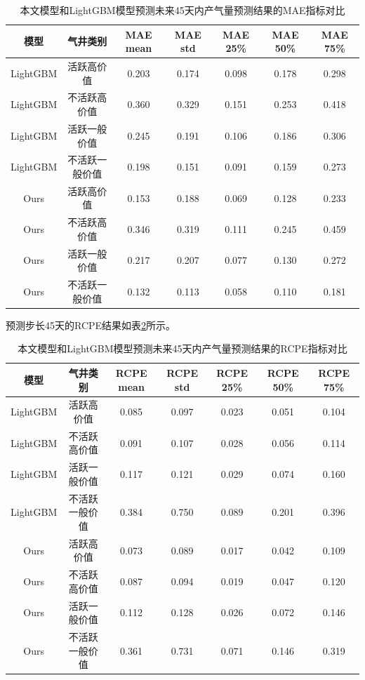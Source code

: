 \begin{table}[H]
    \renewcommand{\arraystretch}{1.5}
    \centering
    \caption{本文模型和LightGBM模型预测未来45天内产气量预测结果的MAE指标对比}
    \label{tab:MAE45}
    \begin{tabular}{|c|c|c|c|c|c|c|}
    \hline
    模型       & 气井类别 & MAE mean & MAE std & MAE 25\% & MAE 50\% & MAE 75\% \\ \hline
    LightGBM  & 活跃高价值        & 0.203   & 0.174    &0.098    & 0.178     & 0.298 \\ \hline
    LightGBM  & 不活跃高价值      & 0.360    & 0.329   & 0.151    & 0.253    & 0.418    \\ \hline
    LightGBM  & 活跃一般价值     & 0.245    & 0.191   & 0.106    & 0.186    & 0.306    \\ \hline
    LightGBM  & 不活跃一般价值      & 0.198    & 0.151   & 0.091    & 0.159    & 0.273    \\ \hline
    Ours       & 活跃高价值        &0.153     & 0.188   & 0.069     & 0.128   & 0.233   \\ \hline
    Ours       & 不活跃高价值      & 0.346    & 0.319   & 0.111    & 0.245    & 0.459    \\ \hline
    Ours       & 活跃一般价值     & 0.217    & 0.207   & 0.077    & 0.130    & 0.272    \\ \hline
    Ours       & 不活跃一般价值      & 0.132    & 0.113   & 0.058    & 0.110    & 0.181    \\ \hline
    \end{tabular}
\end{table}
预测步长45天的RCPE结果如表\ref{tab:RCPE45}所示。 
\begin{table}[H]
    \renewcommand{\arraystretch}{1.5}
    \centering
    \caption{本文模型和LightGBM模型预测未来45天内产气量预测结果的RCPE指标对比}
    \label{tab:RCPE45}
    \begin{tabular}{|c|c|c|c|c|c|c|}
    \hline
    模型       & 气井类别 & RCPE mean & RCPE std & RCPE 25\% & RCPE 50\% & RCPE 75\% \\ \hline
    LightGBM  & 活跃高价值       & 0.085      &0.097    &0.023      &0.051      & 0.104 \\ \hline
    LightGBM  & 不活跃高价值      & 0.091     & 0.107    & 0.028     & 0.056     & 0.114     \\ \hline
    LightGBM  & 活跃一般价值     & 0.117     & 0.121    & 0.029     & 0.074     & 0.160     \\ \hline
    LightGBM  & 不活跃一般价值      & 0.384     & 0.750    & 0.089     & 0.201     & 0.396     \\ \hline
    Ours       &活跃高价值          & 0.073    &0.089      & 0.017     & 0.042     & 0.109 \\ \hline
    Ours       & 不活跃高价值      & 0.087     & 0.094    & 0.019     & 0.047     & 0.120     \\ \hline
    Ours       & 活跃一般价值     & 0.112     & 0.128    & 0.026     & 0.072     & 0.146     \\ \hline
    Ours       & 不活跃一般价值      & 0.361     & 0.731    & 0.071     & 0.146     & 0.319     \\ \hline
    \end{tabular}
\end{table}
